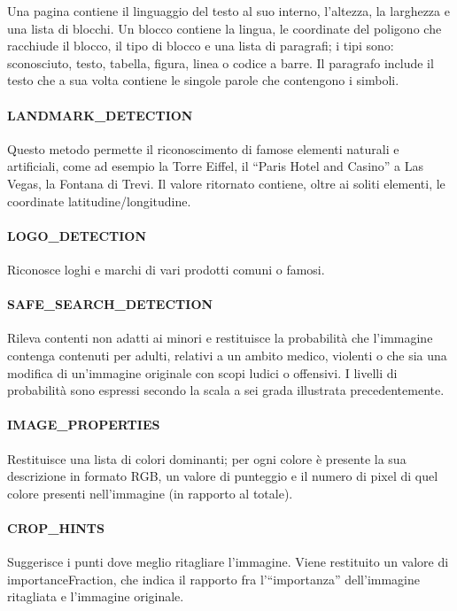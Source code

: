 Una pagina contiene il linguaggio del testo al suo interno, l'altezza, la larghezza e una lista di blocchi.
Un blocco contiene la lingua, le coordinate del poligono che racchiude il blocco, il tipo di blocco e una lista di paragrafi;
i tipi sono: sconosciuto, testo, tabella, figura, linea o codice a barre.
Il paragrafo include il testo che a sua volta contiene le singole parole che contengono i simboli.
%
\paragraph{\textsf{LANDMARK\_DETECTION}} Questo metodo permette il riconoscimento di famose elementi naturali e artificiali, come ad esempio la Torre Eiffel, il ``Paris Hotel and Casino'' a Las Vegas, la Fontana di Trevi.
Il valore ritornato contiene, oltre ai soliti elementi, le coordinate latitudine/longitudine.
%
\paragraph{\textsf{LOGO\_DETECTION}} Riconosce loghi e marchi di vari prodotti comuni o famosi. 
%
\paragraph{\textsf{SAFE\_SEARCH\_DETECTION}} Rileva contenti non adatti ai minori e restituisce la probabilità che l'immagine contenga
contenuti per adulti, relativi a un ambito medico, violenti o che sia una modifica di un'immagine originale con scopi ludici o offensivi.
I livelli di probabilità sono espressi secondo la scala a sei grada illustrata precedentemente.
%
\paragraph{\textsf{IMAGE\_PROPERTIES}} Restituisce una lista di colori dominanti; per ogni colore è presente la sua descrizione in formato RGB,
un valore di punteggio e il numero di pixel di quel colore presenti nell'immagine (in rapporto al totale).
%
\paragraph{\textsf{CROP\_HINTS}} Suggerisce i punti dove meglio ritagliare l'immagine.
Viene restituito un valore di \textsf{importanceFraction}, che indica il rapporto fra l'``importanza'' dell'immagine ritagliata e l'immagine originale.
%
